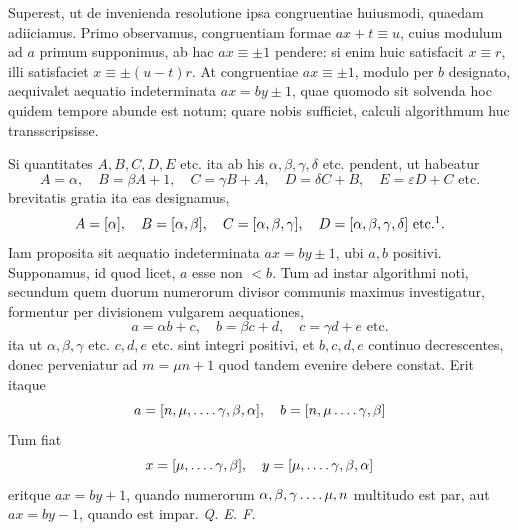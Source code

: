 
Superest, ut de invenienda resolutione ipsa congruentiae huiusmodi, quaedam adiiciamus.
Primo observamus, congruentiam formae $ax+t \equiv u$, cuius modulum ad $a$ primum
supponimus, ab hac $ax \equiv \pm 1$ pendere: si enim huic satisfacit $x \equiv r$, illi
satisfaciet $x \equiv \pm(u-t)r$. At congruentiae $ax \equiv \pm 1$, modulo per $b$
designato, aequivalet aequatio indeterminata $ax = by \pm 1$, quae quomodo sit solvenda
hoc quidem tempore abunde est notum; quare nobis sufficiet, calculi algorithmum huc
transscripsisse.

Si quantitates $A, B, C, D, E$ etc. ita ab his $\alpha, \beta, \gamma, \delta$ etc.
pendent, ut habeatur
\[
A = \alpha, \quad B = \beta A + 1, \quad C = \gamma B + A, \quad D = \delta C + B, \quad
E = \varepsilon D + C \text{ etc.}
\]
brevitatis gratia ita eas designamus,
\begingroup
\renewcommand{\thefootnote}{*)}
\[
A = [\alpha], \quad B = [\alpha, \beta], \quad C = [\alpha, \beta, \gamma], \quad
D = [\alpha, \beta, \gamma, \delta] \text{ etc.}\footnotemark.
\]
\endgroup
Iam proposita sit aequatio indeterminata $ax = by \pm 1$, ubi $a, b$ positivi. Supponamus,
id quod licet, $a$ esse non $< b$. Tum ad instar algorithmi noti, secundum quem duorum
numerorum divisor communis maximus investigatur, formentur per divisionem vulgarem
aequationes,
\[
a = \alpha b + c, \quad b = \beta c + d, \quad c = \gamma d + e \text{ etc.}
\]
ita ut $\alpha, \beta, \gamma$ etc. $c, d, e$ etc. sint integri positivi, et $b, c, d, e$
continuo decrescentes, donec perveniatur ad $m = \mu n + 1$
quod tandem evenire debere constat. Erit itaque
\[
a=[n,\mu,\mathinner{\ldotp\ldotp\ldotp\ldotp} \gamma,\beta,\alpha], \quad b=[n,\mu\mathinner{\ldotp\ldotp\ldotp\ldotp} \gamma,\beta]
\]
Tum fiat
\[
x=[\mu,\mathinner{\ldotp\ldotp\ldotp\ldotp} \gamma,\beta], \quad y=[\mu,\mathinner{\ldotp\ldotp\ldotp\ldotp} \gamma,\beta,\alpha]
\]
eritque $ax=by+1$, quando numerorum $\alpha,\beta,\gamma\mathinner{\ldotp\ldotp\ldotp\ldotp} \mu,n$ multitudo est par, aut
$ax=by-1$, quando est impar. \emph{Q. E. F.}

